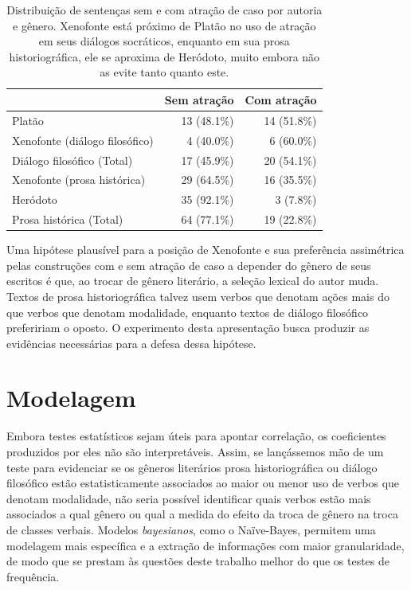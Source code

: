 \documentclass[a4paper,article,12pt,oneside]{memoir}
\begin{document}
\begin{table}[!h]
	\begin{center}
		\begin{tabular}[t]{lrr}
			\toprule
			                               & Sem atração  & Com atração  \\
			\midrule
			Platão                         & 13 (48.1\%)  & 14 (51.8\%)  \\
			Xenofonte (diálogo filosófico) & 4   (40.0\%) & 6 (60.0\%)   \\
			\midrule
			Diálogo filosófico (Total)     & 17 (45.9\%)  & 20  (54.1\%) \\
			\midrule
			\midrule
			Xenofonte (prosa histórica)    & 29 (64.5\%)  & 16  (35.5\%) \\
			Heródoto                       & 35 (92.1\%)  & 3   (7.8\%)  \\
			\midrule
			Prosa histórica (Total)        & 64 (77.1\%)  & 19  (22.8\%) \\
			\bottomrule
		\end{tabular}
	\end{center}
	\caption{Distribuição de sentenças sem e com atração de caso por autoria e gênero. Xenofonte está próximo de Platão no uso de atração em seus diálogos socráticos, enquanto em sua prosa historiográfica, ele se aproxima de Heródoto, muito embora não as evite tanto quanto este.}\label{tab:authgenre}
\end{table}

Uma hipótese plausível para a posição de Xenofonte e sua preferência assimétrica pelas construções com e sem atração de caso a depender do gênero de seus escritos é que, ao trocar de gênero literário, a seleção lexical do autor muda.
Textos de prosa historiográfica talvez usem verbos que denotam ações mais do que verbos que denotam modalidade, enquanto textos de diálogo filosófico prefeririam o oposto.
O experimento desta apresentação busca produzir as evidências necessárias para a defesa dessa hipótese.

\chapter{Modelagem}

Embora testes estatísticos sejam úteis para apontar correlação, os coeficientes produzidos por eles não são interpretáveis.
Assim, se lançássemos mão de um teste para evidenciar se os gêneros literários prosa historiográfica ou diálogo filosófico estão estatisticamente associados ao maior ou menor uso de verbos que denotam modalidade, não seria possível identificar quais verbos estão mais associados a qual gênero ou qual a medida do efeito da troca de gênero na troca de classes verbais.
Modelos \emph{bayesianos}, como o Naïve-Bayes, permitem uma modelagem mais específica e a extração de informações com maior granularidade, de modo que se prestam às questões deste trabalho melhor do que os testes de frequência.
\end{document}
